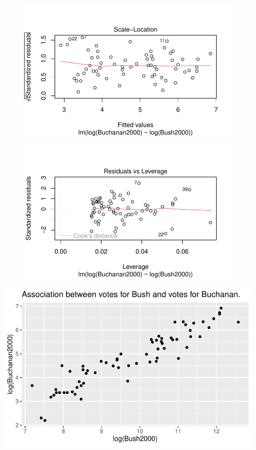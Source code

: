 \documentclass[
  letterpaper,
  DIV=11,
  numbers=noendperiod]{scrartcl}
\begin{document}
\begin{figure}[H]

{\centering \includegraphics{case_study_1_files/figure-pdf/unnamed-chunk-4-3.pdf}

}

\end{figure}

\begin{figure}[H]

{\centering \includegraphics{case_study_1_files/figure-pdf/unnamed-chunk-4-4.pdf}

}

\end{figure}

\includegraphics{case_study_1_files/figure-pdf/unnamed-chunk-5-1.pdf}
\end{document}
